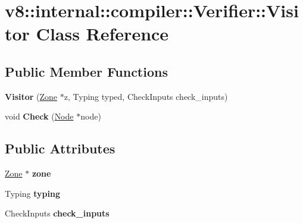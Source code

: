 \hypertarget{classv8_1_1internal_1_1compiler_1_1_verifier_1_1_visitor}{}\section{v8\+:\+:internal\+:\+:compiler\+:\+:Verifier\+:\+:Visitor Class Reference}
\label{classv8_1_1internal_1_1compiler_1_1_verifier_1_1_visitor}
\subsection*{Public Member Functions}
\begin{DoxyCompactItemize}
\item 
{\bfseries Visitor} (\hyperlink{classv8_1_1internal_1_1_zone}{Zone} $\ast$z, Typing typed, Check\+Inputs check\+\_\+inputs)\hypertarget{classv8_1_1internal_1_1compiler_1_1_verifier_1_1_visitor_a932f92d1e419725ed23d6811f0c2cfec}{}\label{classv8_1_1internal_1_1compiler_1_1_verifier_1_1_visitor_a932f92d1e419725ed23d6811f0c2cfec}

\item 
void {\bfseries Check} (\hyperlink{classv8_1_1internal_1_1compiler_1_1_node}{Node} $\ast$node)\hypertarget{classv8_1_1internal_1_1compiler_1_1_verifier_1_1_visitor_a37086288f397a8ef0b41e9c06ffac39e}{}\label{classv8_1_1internal_1_1compiler_1_1_verifier_1_1_visitor_a37086288f397a8ef0b41e9c06ffac39e}

\end{DoxyCompactItemize}
\subsection*{Public Attributes}
\begin{DoxyCompactItemize}
\item 
\hyperlink{classv8_1_1internal_1_1_zone}{Zone} $\ast$ {\bfseries zone}\hypertarget{classv8_1_1internal_1_1compiler_1_1_verifier_1_1_visitor_a360d0d62b24bb7179d892e8913cce9ab}{}\label{classv8_1_1internal_1_1compiler_1_1_verifier_1_1_visitor_a360d0d62b24bb7179d892e8913cce9ab}

\item 
Typing {\bfseries typing}\hypertarget{classv8_1_1internal_1_1compiler_1_1_verifier_1_1_visitor_a19cd8d4aab6da178273eea75afa0fc3c}{}\label{classv8_1_1internal_1_1compiler_1_1_verifier_1_1_visitor_a19cd8d4aab6da178273eea75afa0fc3c}

\item 
Check\+Inputs {\bfseries check\+\_\+inputs}\hypertarget{classv8_1_1internal_1_1compiler_1_1_verifier_1_1_visitor_afb448703175b0d1d99c57baba6627f9e}{}\label{classv8_1_1internal_1_1compiler_1_1_verifier_1_1_visitor_afb448703175b0d1d99c57baba6627f9e}

\end{DoxyCompactItemize}
